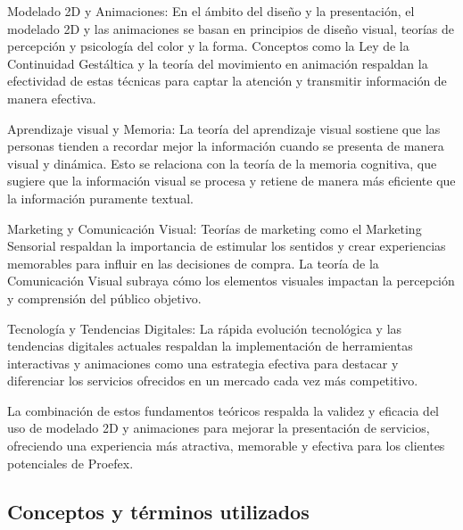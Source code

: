  Modelado 2D y Animaciones: En el ámbito del diseño y la presentación, el modelado 2D
 y las animaciones se basan en principios de diseño visual, teorías de percepción y
 psicología del color y la forma. Conceptos como la Ley de la Continuidad Gestáltica
 y la teoría del movimiento en animación respaldan la efectividad de estas técnicas
 para captar la atención y transmitir información de manera efectiva.

 Aprendizaje visual y Memoria: La teoría del aprendizaje visual sostiene que las
 personas tienden a recordar mejor la información cuando se presenta de manera visual
 y dinámica. Esto se relaciona con la teoría de la memoria cognitiva, que sugiere que
 la información visual se procesa y retiene de manera más eficiente que la información
 puramente textual.

 Marketing y Comunicación Visual: Teorías de marketing como el Marketing Sensorial
 respaldan la importancia de estimular los sentidos y crear experiencias memorables
 para influir en las decisiones de compra. La teoría de la Comunicación Visual subraya
 cómo los elementos visuales impactan la percepción y comprensión del público objetivo.

  Tecnología y Tendencias Digitales: La rápida evolución tecnológica y las tendencias
  digitales actuales respaldan la implementación de herramientas interactivas y
  animaciones como una estrategia efectiva para destacar y diferenciar los servicios
  ofrecidos en un mercado cada vez más competitivo.

  La combinación de estos fundamentos teóricos respalda la validez y eficacia del uso
  de modelado 2D y animaciones para mejorar la presentación de servicios, ofreciendo
  una experiencia más atractiva, memorable y efectiva para los clientes potenciales de
  Proefex.

\subsection{Conceptos y términos utilizados}

